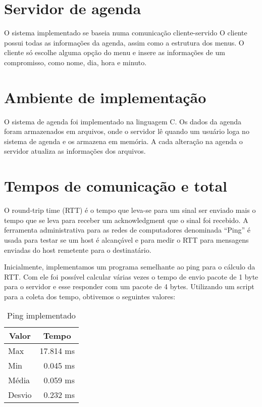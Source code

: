 \documentclass[10pt,a4paper]{article}
\begin{document}
\section{Servidor de agenda}
  O sistema implementado se baseia numa comunicação cliente-servido O cliente possui todas as informações da agenda, assim como a estrutura dos menus. O cliente só escolhe alguma opção do menu e insere as informações de um compromisso, como nome, dia, hora e minuto.

\section{Ambiente de implementação}
  O sistema de agenda foi implementado na linguagem C. Os dados da agenda foram armazenados em arquivos, onde o servidor lê quando um usuário loga no sistema de agenda e os armazena em memória. A cada alteração na agenda o servidor atualiza as informações dos arquivos.

\section{Tempos de comunicação e total}
O round-trip time (RTT) é o tempo que leva-se para um sinal ser
enviado mais o tempo que se leva para receber um acknowledgment que o
sinal foi recebido. A ferramenta administrativa para as redes de
computadores denominada ``Ping'' é usada para testar se um host é alcançável e para
medir o RTT para mensagens enviadas do host remetente para o
destinatário.

Inicialmente, implementamos um programa semelhante ao ping para o
cálculo da RTT. Com ele foi possível calcular várias vezes o tempo de envio pacote
de 1 byte para o servidor e esse responder com um pacote de 4
bytes. Utilizando um script para a coleta dos tempo, obtivemos o
seguintes valores:

\begin{table}[h!]
\caption{Ping implementado}
\begin{center}
  \begin{tabular}{lr}
    \multicolumn{1}{c}{Valor} & \multicolumn{1}{c}{Tempo}\\
    \hline
    Max & 17.814 ms\\
    Min & 0.045 ms\\
    Média & 0.059 ms \\
    Desvio & 0.232 ms
  \end{tabular}

\end{center}
\end{table}
\end{document}
